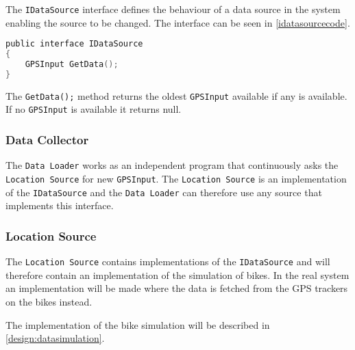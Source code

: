The \lstinline!IDataSource! interface defines the behaviour of a data source in the system enabling the source to be changed.
The interface can be seen in \cref{idatasourcecode}.

\begin{lstlisting}[language=C,caption=The IDataSource interface,label=idatasourcecode]
public interface IDataSource
{
	GPSInput GetData();
}
\end{lstlisting}

The \lstinline!GetData();! method returns the oldest \lstinline!GPSInput! available if any is available.
If no \lstinline!GPSInput! is available it returns null.

\subsubsection{Data Collector}
The \texttt{Data Loader} works as an independent program that continuously asks the \lstinline!Location Source! for new \lstinline!GPSInput!.
The \lstinline!Location Source! is an implementation of the \lstinline!IDataSource! and the \texttt{Data Loader} can therefore use any source that implements this interface.

\subsubsection{Location Source}\label{design:location_source}
The \texttt{Location Source} contains implementations of the \lstinline!IDataSource! and will therefore contain an implementation of the simulation of bikes.
In the real system an implementation will be made where the data is fetched from the GPS trackers on the bikes instead.

The implementation of the bike simulation will be described in \cref{design:datasimulation}.
 